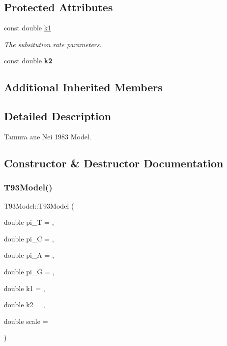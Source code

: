 \subsection*{Protected Attributes}
\textbf{ }\par
\begin{DoxyCompactItemize}
\item 
const double \mbox{\hyperlink{classrcombinator_1_1T93Model_a98c3187ba2e9da1f608f17b1e3cf341b}{k1}}
\begin{DoxyCompactList}\small\item\em The subsitution rate parameters. \end{DoxyCompactList}\item 
\mbox{\label{classrcombinator_1_1T93Model_a1806ba62860b111c56accc16f1ffdb3d}} 
const double {\bfseries k2}
\end{DoxyCompactItemize}

\subsection*{Additional Inherited Members}


\subsection{Detailed Description}
Tamura ane Nei 1983 Model. 

\subsection{Constructor \& Destructor Documentation}
\mbox{\label{classrcombinator_1_1T93Model_ad857daf369e1d16fc8233b08dc0deef8}} 
\subsubsection{\texorpdfstring{T93\+Model()}{T93Model()}}
{\footnotesize\ttfamily T93\+Model\+::\+T93\+Model (\begin{DoxyParamCaption}\item[{double}]{pi\+\_\+T = {},  }\item[{double}]{pi\+\_\+C = {},  }\item[{double}]{pi\+\_\+A = {},  }\item[{double}]{pi\+\_\+G = {},  }\item[{double}]{k1 = {},  }\item[{double}]{k2 = {},  }\item[{double}]{scale = {} }\end{DoxyParamCaption})}



